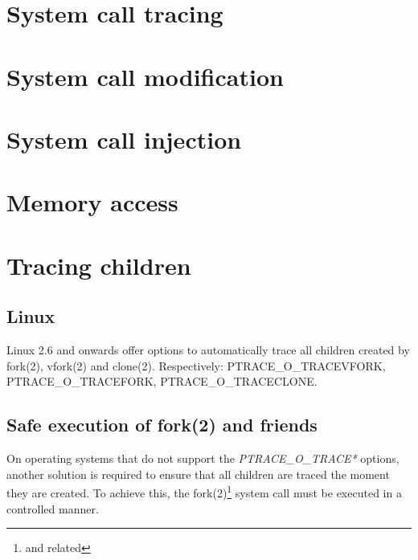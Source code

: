 \documentclass[a4paper, twoside, 10pt, twocolumn]{report}
\begin{document}

\section{System call tracing}

\section{System call modification}

\section{System call injection}


\section{Memory access}


\section{Tracing children}

\subsection{Linux}

Linux 2.6 and onwards offer options to automatically trace all children
created by fork(2), vfork(2) and clone(2). Respectively:
PTRACE\_O\_TRACEVFORK, PTRACE\_O\_TRACEFORK, PTRACE\_O\_TRACECLONE.



\subsection{Safe execution of fork(2) and friends}

On operating systems that do not support the \textit{PTRACE\_O\_TRACE*} options,
another solution is required to ensure that all children are traced the moment
they are created. To achieve this, the fork(2)\footnote{and related} system call
must be executed in a controlled manner.
\end{document}
